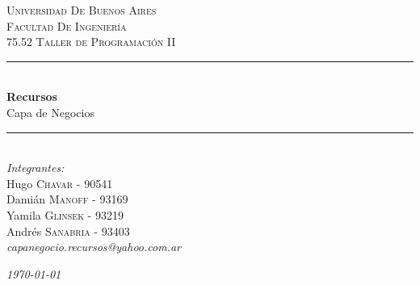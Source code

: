\documentclass{article}
\begin{document}
\lstset{language=XML,
        breaklines=true}
\begin{titlepage}

\newcommand{\HRule}{\rule{\linewidth}{0.5mm}} %

\center %
 

\textsc{\LARGE Universidad De Buenos Aires}\\[1.5cm] %
\textsc{\Large Facultad De Ingeniería}\\[0.5cm] %
\textsc{\large 75.52 Taller de Programaci\'on II}\\[0.5cm] %


\HRule \\[0.4cm]
{ \huge \bfseries Recursos}\\ Capa de Negocios\\[0.4cm] %
\HRule \\[1.5cm]
 

\Large \emph{Integrantes:}\\

Hugo \textsc{Chavar} - 90541\\ %
Dami\'an \textsc{Manoff} - 93169\\ %
Yamila \textsc{Glinsek} - 93219\\ %
Andr\'es \textsc{Sanabria} - 93403\\[5cm] %

\textit{capanegocio.recursos@yahoo.com.ar}

{\large \text \em \today }\\[3cm] %
 

\vfill %

\end{titlepage}
\tableofcontents
\newpage
\end{document}
